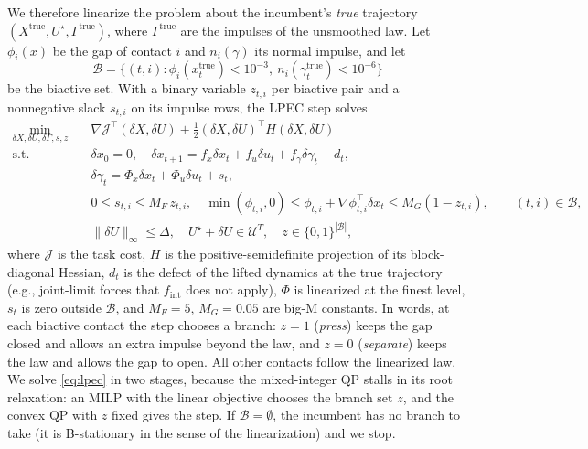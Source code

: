 \documentclass[11pt]{article}
\theoremstyle{remark}
\newcommand{\fint}{f_{\mathrm{int}}}
\newcommand{\U}{\mathcal{U}}
\newcommand{\B}{\mathcal{B}}
\newcommand{\inc}{U^\star}
\begin{document}
We therefore linearize the problem about the incumbent's \emph{true} trajectory $(X^{\mathrm{true}}, \inc, \Gamma^{\mathrm{true}})$, where $\Gamma^{\mathrm{true}}$ are the impulses of the unsmoothed law. Let $\phi_i(x)$ be the gap of contact $i$ and $n_i(\gamma)$ its normal impulse, and let
\begin{equation}
\label{eq:biactive}
\B = \{(t, i) : \phi_i(x^{\mathrm{true}}_t) < 10^{-3},\ n_i(\gamma^{\mathrm{true}}_t) < 10^{-6}\}
\end{equation}
be the biactive set. With a binary variable $z_{t,i}$ per biactive pair and a nonnegative slack $s_{t,i}$ on its impulse rows, the LPEC step solves
\begin{subequations}
\label{eq:lpec}
\begin{align}
\min_{\delta X, \delta U, \delta\Gamma, s, z} \quad & \nabla \mathcal{J}^\top (\delta X, \delta U) + \tfrac12 (\delta X, \delta U)^\top H (\delta X, \delta U) \\
\text{s.t.} \quad & \delta x_0 = 0, \quad \delta x_{t+1} = f_x \delta x_t + f_u \delta u_t + f_\gamma \delta\gamma_t + d_t, \label{eq:lpec_dyn}\\
& \delta\gamma_t = \Phi_x \delta x_t + \Phi_u \delta u_t + s_t, \label{eq:lpec_law}\\
& 0 \leq s_{t,i} \leq M_F\, z_{t,i}, \quad \min(\phi_{t,i}, 0) \leq \phi_{t,i} + \nabla\phi_{t,i}^\top \delta x_t \leq M_G (1 - z_{t,i}), \qquad (t,i) \in \B, \label{eq:lpec_branch}\\
& \|\delta U\|_\infty \leq \Delta, \quad \inc + \delta U \in \U^T, \quad z \in \{0,1\}^{|\B|},
\end{align}
\end{subequations}
where $\mathcal J$ is the task cost, $H$ is the positive-semidefinite projection of its block-diagonal Hessian, $d_t$ is the defect of the lifted dynamics at the true trajectory (e.g., joint-limit forces that $\fint$ does not apply), $\Phi$ is linearized at the finest level, $s_t$ is zero outside $\B$, and $M_F = 5$, $M_G = 0.05$ are big-M constants. In words, at each biactive contact the step chooses a branch: $z = 1$ (\emph{press}) keeps the gap closed and allows an extra impulse beyond the law, and $z = 0$ (\emph{separate}) keeps the law and allows the gap to open. All other contacts follow the linearized law. We solve \cref{eq:lpec} in two stages, because the mixed-integer QP stalls in its root relaxation: an MILP with the linear objective chooses the branch set $z$, and the convex QP with $z$ fixed gives the step. If $\B = \emptyset$, the incumbent has no branch to take (it is B-stationary in the sense of the linearization) and we stop.
\end{document}
